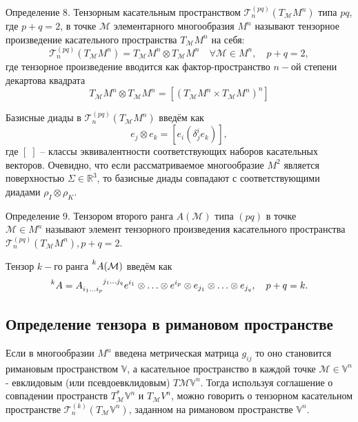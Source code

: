 \documentclass[14pt,a4paper]{extarticle}
\begin{document}
Определение 8. Тензорным касательным пространством $\mathcal{T}_n^{(pq)}(T_{\mathcal{M}}M^n)$ типа $pq$, где $p+q=2$, в точке $\mathcal{M}$ элементарного многообразия $M^n$ называют тензорное произведение касательного пространства $T_{\mathcal{M}}M^n$ на себя:
\begin{equation}\label{eq19}
	\mathcal{T}_{n}^{(p q)}\left(T_{\mathcal{M}} M^{n}\right)=T_{\mathcal{M}} M^{n} \otimes T_{\mathcal{M}} M^{n} \quad \forall \mathcal{M} \in M^{n}, \quad p+q=2,
\end{equation}
где тензорное произведение вводится как фактор-пространство $n-$ой степени декартова квадрата
\begin{equation}\label{eq20}
	T_{\mathcal{M}}M^n \otimes T_{\mathcal{M}}M^n = [(T_{\mathcal{M}}M^n \times T_{\mathcal{M}}M^n)^n]
\end{equation}

Базисные диады в $\mathcal{T}_n^{(pq)}(T_{\mathcal{M}}M^n)$ введём как
\begin{equation}\label{eq21}
	e_j \otimes e_k = [e_i(\delta_j^ie_k)],
\end{equation}
где $[\;]$ -- классы эквивалентности соответствующих наборов касательных векторов. Очевидно, что если рассматриваемое многообразие $M^2$ является поверхностью $\Sigma \in \mathbb{R}^3$, то базисные диады совпадают с соответствующими диадами $\rho_I \otimes \rho_K$.

Определение 9. Тензором второго ранга $A(\mathcal{M})$ типа $(pq)$ в точке \\$\mathcal{M} \in M^n$ называют элемент тензорного произведения касательного пространства $\mathcal{T}_n^{(pq)} (T_{\mathcal{M}}M^n), p+q=2$.

Тензор $k-$го ранга $\prescript{k}{}{A(\mathcal{M})}$ введём как 
\begin{equation}\label{eq22}
	\prescript{k}{}{A} = A\indices{_{i_1\ldots i_p}^{j_1 \ldots j_q}} e^{i_1} \otimes \ldots \otimes e^{i_p} \otimes e_{j_1} \otimes \ldots \otimes e_{j_q}, \quad p+q=k.
\end{equation}

\subsection{Определение тензора в римановом пространстве}
Если в многообразии $M^n$ введена метрическая матрица $g_{ij}$ то оно становится римановым пространством $\mathbb{V}$, а касательное пространство в каждой точке $\mathcal{M} \in \mathbb{V}^n$ - евклидовым (или псевдоевклидовым) $T\mathcal{M} \mathbb{V}^n$. Тогда используя соглашение о совпадении пространств $T_{\mathcal{M}}^*\mathbb{V}^n$ и $T_{\mathcal{M}}V^n$, можно говорить о тензорном касательном пространстве $\mathcal{T}_n^{(k)}(T_{\mathcal{M}}\mathbb{V}^n)$, заданном на римановом пространстве $\mathbb{V}^n$.
\end{document}
